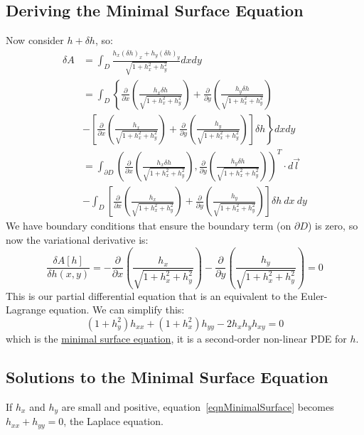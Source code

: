 \documentclass[../Main.tex]{subfiles}
\begin{document}
\subsection{Deriving the Minimal Surface Equation}
Now consider $h + \delta h$, so:
\begin{align*}
    \delta A &= \int_D \frac{h_x (\delta h)_x + h_y (\delta h)_y}{\sqrt{1 + h_x^2 + h_y^2}} dx dy \\
    &= \int_D \left\{\frac{\partial}{\partial x}\left(\frac{h_x \delta h}{\sqrt{1 + h_x^2 + h_y^2}}\right) + \frac{\partial}{\partial y} \left(\frac{h_y \delta h}{\sqrt{1 + h_x^2 + h_y^2}}\right) \right. \\
    &\left. - \left[\frac{\partial}{\partial x} \left(\frac{h_x}{\sqrt{1 + h_x^2 + h_y^2}}\right) + \frac{\partial}{\partial y}\left(\frac{h_y}{\sqrt{1 + h_x^2 + h_y^2}}\right)\right] \delta h\right\} dx dy \\
    &= \int_{\partial D} \left(\frac{\partial}{\partial x}\left(\frac{h_x \delta h}{\sqrt{1 + h_x^2 + h_y^2}}\right), \frac{\partial}{\partial y} \left(\frac{h_y \delta h}{\sqrt{1 + h_x^2 + h_y^2}}\right) \right)^T \cdot d\vec{l} \\
    &- \int_D \left[\frac{\partial}{\partial x} \left(\frac{h_x}{\sqrt{1 + h_x^2 + h_y^2}}\right) + \frac{\partial}{\partial y}\left(\frac{h_y}{\sqrt{1 + h_x^2 + h_y^2}}\right)\right] \delta h~dx~dy
\end{align*}
We have boundary conditions that ensure the boundary term (on $\partial D$) is zero, so now the variational derivative is:
\begin{equation*}
    \frac{\delta A[h]}{\delta h(x, y)} = - \frac{\partial}{\partial x} \left(\frac{h_x}{\sqrt{1 + h_x^2 + h_y^2}}\right) - \frac{\partial}{\partial y}\left(\frac{h_y}{\sqrt{1 + h_x^2 + h_y^2}}\right) = 0
\end{equation*}
This is our partial differential equation that is an equivalent to the Euler-Lagrange equation. We can simplify this:
\begin{equation}
    (1 + h_y^2)h_{xx} + (1 + h_x^2) h_{yy} - 2h_x h_y h_{xy} = 0
    \label{eqnMinimalSurface}
\end{equation}
which is the \underline{minimal surface equation}, it is a second-order non-linear PDE for $h$.
\subsection{Solutions to the Minimal Surface Equation}
If $h_x$ and $h_y$ are small and positive, equation~\ref{eqnMinimalSurface} becomes $h_{xx} + h_{yy} = 0$, the Laplace equation.
\end{document}
